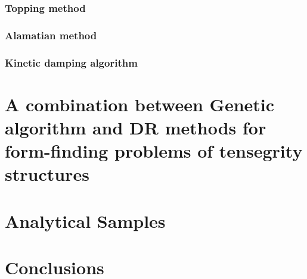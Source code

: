 \documentclass[preprint,3p,12pt]{elsarticle}
\begin{document}
\subsubsection{Topping method}

\subsubsection{Alamatian method}

\subsubsection{Kinetic damping algorithm}

\section{A combination between Genetic algorithm and DR methods for form-finding problems of tensegrity structures}
\label{sec:3}

\section{Analytical Samples} \label{subsec:4} 

\section{Conclusions}

 





\end{document}
